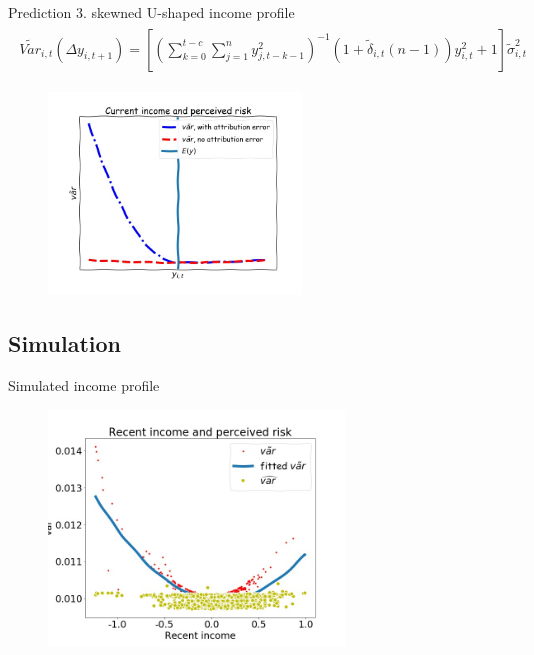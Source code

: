 \documentclass{beamer}
\begin{document}
\begin{frame}{Prediction 3. skewned U-shaped income profile}
	\begin{eqnarray}
		\begin{split}
			\tilde {Var}_{i,t}(\Delta y_{i,t+1})  = [(\sum^{t-c}_{k=0}\sum^{n}_{j=1}y^2_{j,t-k-1})^{-1}(1+\tilde\delta_{i,t}(n-1))y^2_{i,t} + 1] \tilde{\sigma}^2_{i,t} 
		\end{split}
	\end{eqnarray}
		\begin{figure}
		\centering 
		\label{var_experience_var}
		\includegraphics[width=0.6\textwidth, height = 0.6\textheight]{figures/var_recent.jpg}
	\end{figure}
\end{frame}



\subsection{Simulation}	


\begin{frame}{Simulated income profile}
	\begin{figure}
		\centering 
		\label{var_experience_var}
		\includegraphics[width=0.7\textwidth]{figures/var_recent_sim.jpg}
	\end{figure}
\end{frame}
\end{document}
